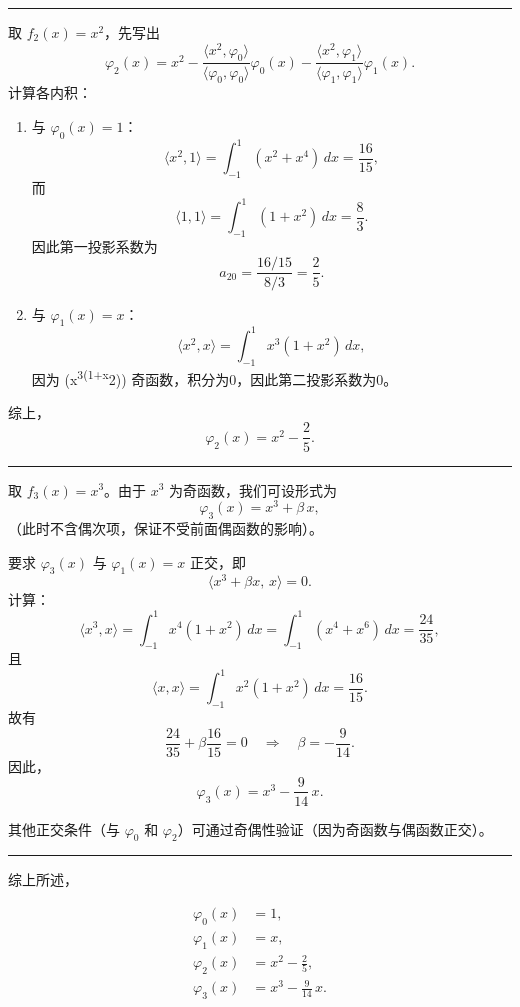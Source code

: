\documentclass[11pt]{article}
\begin{document}
\begin{center}\rule{0.5\linewidth}{0.5pt}\end{center}

取 \(f_2(x)=x^2\)，先写出 \[
\varphi_2(x)=x^2-\frac{\langle x^2,\varphi_0\rangle}{\langle \varphi_0,\varphi_0\rangle}\varphi_0(x) - \frac{\langle x^2,\varphi_1\rangle}{\langle \varphi_1,\varphi_1\rangle}\varphi_1(x).
\] 计算各内积：

\begin{enumerate}
\def\labelenumi{\arabic{enumi}.}
\item
  与 \(\varphi_0(x)=1\)： \[
  \langle x^2,1\rangle=\int_{-1}^{1}(x^2+x^4)\,dx =\frac{16}{15},
  \] 而 \[
  \langle 1,1\rangle=\int_{-1}^{1}(1+x^2)\,dx = \frac{8}{3}.
  \] 因此第一投影系数为 \[
  a_{20}=\frac{16/15}{8/3}=\frac{2}{5}.
  \]
\item
  与 \(\varphi_1(x)=x\)： \[
  \langle x^2,x\rangle=\int_{-1}^{1}x^3(1+x^2)\,dx,
  \] 因为 (x\textsuperscript{3(1+x}2))
  奇函数，积分为0，因此第二投影系数为0。
\end{enumerate}

综上， \[
\varphi_2(x)=x^2-\frac{2}{5}.
\]

\begin{center}\rule{0.5\linewidth}{0.5pt}\end{center}

取 \(f_3(x)=x^3\)。由于 \(x^3\) 为奇函数，我们可设形式为 \[
\varphi_3(x)=x^3+ \beta\,x,
\] （此时不含偶次项，保证不受前面偶函数的影响）。

要求 \(\varphi_3(x)\) 与 \(\varphi_1(x)=x\) 正交，即 \[
\langle x^3+\beta x,\, x\rangle=0.
\] 计算： \[
\langle x^3, x\rangle=\int_{-1}^{1}x^4(1+x^2)\,dx=\int_{-1}^{1}(x^4+x^6)\,dx =\frac{24}{35},
\] 且 \[
\langle x, x\rangle=\int_{-1}^{1}x^2(1+x^2)\,dx=\frac{16}{15}.
\] 故有 \[
\frac{24}{35}+\beta\frac{16}{15}=0\quad\Longrightarrow\quad \beta=-\frac{9}{14}.
\] 因此， \[
\varphi_3(x)= x^3-\frac{9}{14}\,x.
\]

其他正交条件（与 \(\varphi_0\) 和
\(\varphi_2\)）可通过奇偶性验证（因为奇函数与偶函数正交）。

\begin{center}\rule{0.5\linewidth}{0.5pt}\end{center}

综上所述，

\[
\begin{aligned}
\varphi_0(x)&=1,\\[1mm]
\varphi_1(x)&=x,\\[1mm]
\varphi_2(x)&=x^2-\frac{2}{5},\\[1mm]
\varphi_3(x)&=x^3-\frac{9}{14}\,x.
\end{aligned}
\]
\end{document}

